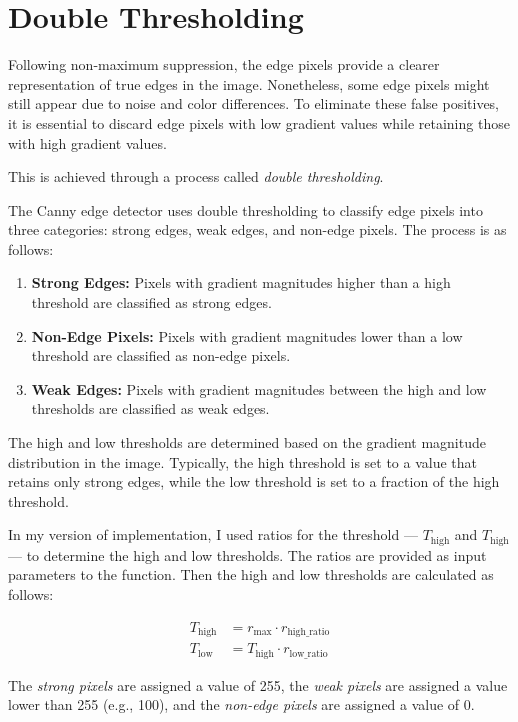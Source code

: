 \section{Double Thresholding}
\label{sec:double-thresholding}

Following non-maximum suppression, the edge pixels provide a clearer representation of true edges in the image. Nonetheless, some edge pixels might still appear due to noise and color differences. To eliminate these false positives, it is essential to discard edge pixels with low gradient values while retaining those with high gradient values.

This is achieved through a process called \emph{double thresholding}.

The Canny edge detector uses double thresholding to classify edge pixels into three categories: strong edges, weak edges, and non-edge pixels. The process is as follows:

\begin{enumerate}
    \item \textbf{Strong Edges:} Pixels with gradient magnitudes higher than a high threshold are classified as strong edges.
    \item \textbf{Non-Edge Pixels:} Pixels with gradient magnitudes lower than a low threshold are classified as non-edge pixels.
    \item \textbf{Weak Edges:} Pixels with gradient magnitudes between the high and low thresholds are classified as weak edges.
\end{enumerate}

The high and low thresholds are determined based on the gradient magnitude distribution in the image. Typically, the high threshold is set to a value that retains only strong edges, while the low threshold is set to a fraction of the high threshold.

In my version of implementation, I used ratios for the threshold --- $ T_{\text{high}} $ and $ T_{\text{high}} $ --- to determine the high and low thresholds. The ratios are provided as input parameters to the function. Then the high and low thresholds are calculated as follows:

\begin{align*}
    T_{\text{high}} & = r_{\text{max}} \cdot r_{\text{high\_ratio}} \\
    T_{\text{low}}  & = T_{\text{high}} \cdot r_{\text{low\_ratio}}
\end{align*}

The \emph{strong pixels} are assigned a value of 255, the \emph{weak pixels} are assigned a value lower than 255 (e.g., 100), and the \emph{non-edge pixels} are assigned a value of 0.

